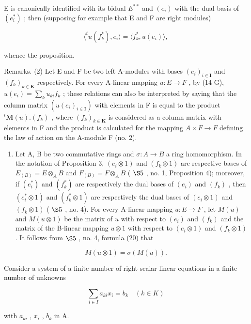 E is canonically identified with its bidual \(E^{**}\) and \((e_{i})\) with the dual basis of \((e_{i}^{*})\) ; then (supposing for example that E and F are right modules)

\[
\langle^ {t} u (f _ {k} ^ {*}), e _ {i} \rangle = \langle f _ {k} ^ {*}, u (e _ {i}) \rangle ,
\]

whence the proposition.

Remarks. (2) Let E and F be two left A-modules with bases \((e_{i})_{i\in\mathbf{I}}\) and \((f_{k})_{k\in\mathbf{K}}\) respectively. For every A-linear mapping \(u:E\to F\) , by (14 G), \(u(e_{i})=\sum_{k}u_{ki}f_{k}\) ; these relations can also be interpreted by saying that the column matrix \((u(e_{i})_{i\in\mathbf{I}})\) with elements in F is equal to the product \({}^{t}\mathbf{M}(u).(f_{k})\) , where \((f_{k})_{k\in\mathbf{K}}\) is considered as a column matrix with elements in F and the product is calculated for the mapping \(A\times F\to F\) defining the law of action on the A-module F (no. 2).

\begin{enumerate}
\def\labelenumi{(\arabic{enumi})}
\setcounter{enumi}{2}
\tightlist
\item
  Let A, B be two commutative rings and \(\sigma: A \to B\) a ring homomorphism. In the notation of Proposition 3, \((e_i \otimes 1)\) and \((f_k \otimes 1)\) are respective bases of \(E_{(B)} = E \otimes_A B\) and \(F_{(B)} = F \otimes_A B\) ( \(\S 5\) , no. 1, Proposition 4); moreover, if \((e_i^*)\) and \((f_k^*)\) are respectively the dual bases of \((e_i)\) and \((f_k)\) , then \((e_i^* \otimes 1)\) and \((f_k^* \otimes 1)\) are respectively the dual bases of \((e_i \otimes 1)\) and \((f_k \otimes 1)\) ( \(\S 5\) , no. 4). For every A-linear mapping \(u: E \to F\) , let \(M(u)\) and \(M(u \otimes 1)\) be the matrix of \(u\) with respect to \((e_i)\) and \((f_k)\) and the matrix of the B-linear mapping \(u \otimes 1\) with respect to \((e_i \otimes 1)\) and \((f_k \otimes 1)\) . It follows from \(\S 5\) , no. 4, formula (20) that
\end{enumerate}

\[
M (u \otimes 1) = \sigma (M (u)).
\]

Consider a system of a finite number of right scalar linear equations in a finite number of unknowns

\[
\sum_ {i \in I} a _ {k i} x _ {i} = b _ {k} \quad (k \in K)\tag{19}
\]

with \(a_{ki}\) , \(x_{i}\) , \(b_{k}\) in A.

